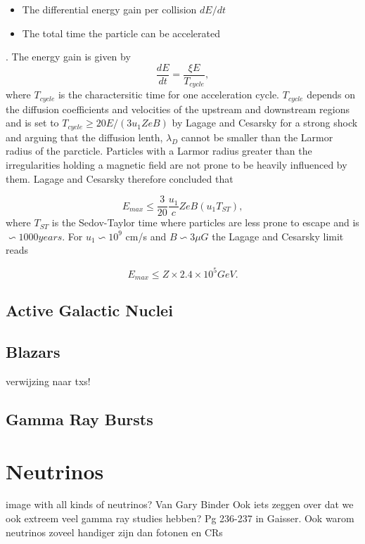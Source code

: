 \begin{itemize}
\item The differential energy gain per collision $dE/dt$
\item The total time the particle can be accelerated
\end{itemize}.
The energy gain is given by
\begin{equation}
\frac{dE}{dt} = \frac{\xi E}{T_{cycle}},
\end{equation}
where $T_{cycle}$ is the charactersitic time for one acceleration cycle. $T_{cycle}$ depends on the diffusion coefficients and velocities of the upstream and downstream regions and is set to $T_{cycle} \geq 20 E/(3 u_1 Z e B)$ by Lagage and Cesarsky \cite{Lagage:1983zz} for a strong shock and arguing that the diffusion lenth, $\lambda_D$ cannot be smaller than the Larmor radius of the parcticle. Particles with a Larmor radius greater than the irregularities holding a magnetic field are not prone to be heavily influenced by them. Lagage and Cesarsky therefore concluded that

\begin{equation}
E_{max} \leq \frac{3}{20} \frac{u_1}{c} Z e B (u_1 T_{ST}),
\end{equation}
where $T_{ST}$ is the Sedov-Taylor time where particles are less prone to escape and is $\backsim 1000 years$. For $u_1 \backsim 10^9$ cm/s \cite{stanev2010high}  and $B \backsim 3\mu G$ the Lagage and Cesarsky limit reads

\begin{equation}
E_{max} \leq Z \times 2.4 \times 10^5 GeV.
\end{equation}

\subsection{Active Galactic Nuclei}
\subsection{Blazars}
verwijzing naar txs!
\subsection{Gamma Ray Bursts}

\section{Neutrinos}
image with all kinds of neutrinos? Van Gary Binder
Ook iets zeggen over dat we ook extreem veel gamma ray studies hebben? Pg 236-237 in Gaisser.
Ook warom neutrinos zoveel handiger zijn dan fotonen en CRs
